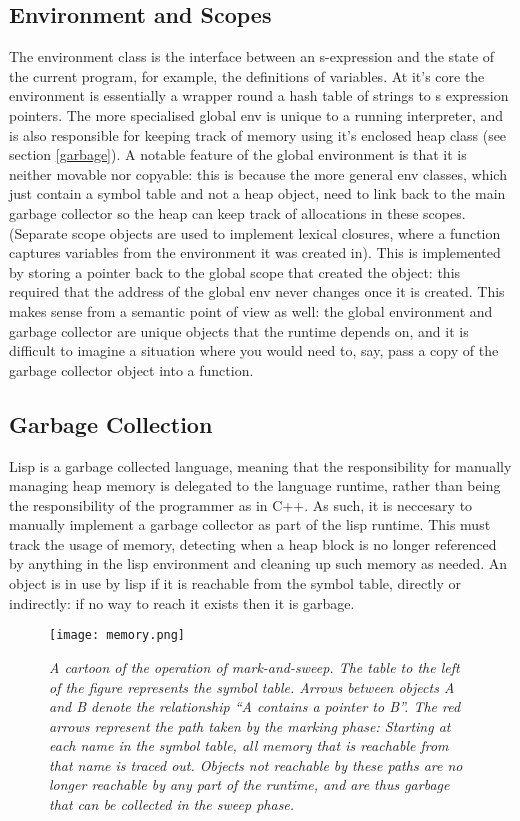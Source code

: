 \documentclass[12pt]{article}
\begin{document}
\subsection{Environment and Scopes}
The environment class is the interface between an s-expression and the state of
the current program, for example, the definitions of variables. At it's core
the environment is essentially a wrapper round a hash table of strings to
s expression pointers. The more specialised global env is unique to a running
interpreter, and is also responsible for keeping track of memory using it's enclosed heap class (see section \ref{garbage}).
A notable feature of the global environment is that it is neither movable
nor copyable: this is because the more general env classes, which just contain
a symbol table and not a heap object, need to link back to the main garbage
collector so the heap can keep track of allocations in these scopes. (Separate
scope objects are used to implement lexical closures, where a function captures variables from the environment it was created in). This is implemented by storing a pointer back to the global scope that created the object: this required that the address of the global env never changes once it is created.
This makes sense from a semantic point of view as well: the global environment and garbage collector are unique objects that the runtime depends on, and it
is difficult to imagine a situation where you would need to, say, pass a copy
of the garbage collector object into a function.
\subsection{Garbage Collection}
\label{section:garbage}
Lisp is a garbage collected language, meaning that the responsibility for manually managing heap memory is delegated to the language runtime, rather than
being the responsibility of the programmer as in C++. As such, it is neccesary to manually implement a garbage collector as part of the lisp runtime. This must
track the usage of memory, detecting when a heap block is no longer referenced by anything in the lisp environment and cleaning up such memory as needed.
An object is in use by lisp if it is reachable from the symbol table, directly or indirectly: if no way to reach it exists then it is garbage.

\begin{figure}
  \centering
  \texttt{[image: memory.png]}
  \caption{\textit{
  A cartoon of the operation of mark-and-sweep. The table to the left of the
  figure represents the symbol table. Arrows between objects A and B denote the
  relationship ``A contains a pointer to B''. The red arrows represent the
  path taken by the marking phase: Starting at each name in the symbol table,
  all memory that is reachable from that name is traced out. Objects not
  reachable by these paths are no longer reachable by any part of the runtime,
  and are thus garbage that can be collected in the sweep phase.
  }}
\end{figure}
\end{document}
